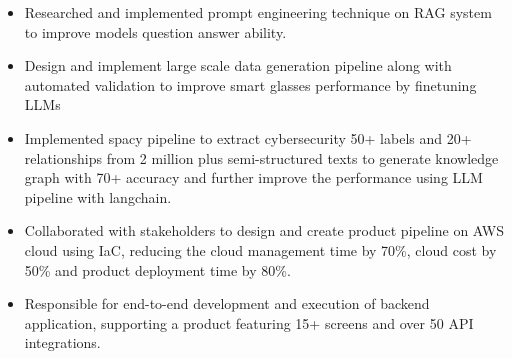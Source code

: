 \documentclass[10pt,a4paper,ragged2e,withhyper]{altacv}
\author{Madhusudan Kumar}
\date{\today}
\title{}
\begin{document}
\makecvheader
\begin{paracol}{2}
\label{sec:org94e57f8}


\begin{itemize}
\item Researched and implemented prompt engineering technique on RAG system to improve models question answer ability.
\item Design and implement large scale data generation pipeline along with automated validation to improve smart glasses performance by finetuning LLMs
\end{itemize}


\par\divider
{}

\begin{itemize}
\item Implemented spacy pipeline to extract cybersecurity 50+ labels and 20+ relationships from 2 million plus semi-structured texts to generate knowledge graph with 70+ accuracy and further improve the performance using LLM pipeline with langchain.
\end{itemize}

\begin{itemize}
\item Collaborated with stakeholders to design and create product pipeline on AWS cloud using IaC, reducing the cloud management time by 70\%, cloud cost by 50\% and product deployment time by 80\%.
\item Responsible for end-to-end development and execution of backend application, supporting a product featuring 15+ screens and over 50 API integrations.
\end{itemize}


\par\divider
{}


\end{paracol}
\end{document}
